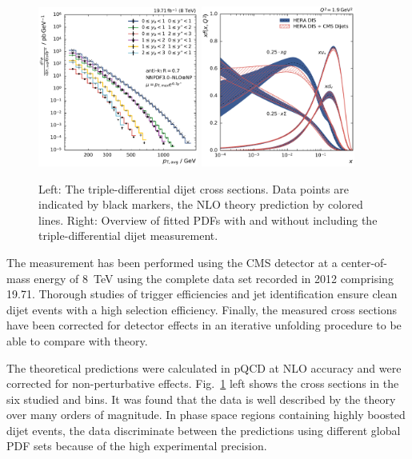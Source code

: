 \begin{figure}[h!tbp]
    \centering
    \includegraphics[width=0.47\textwidth]{figures/measurement/ptavg_spectrum.pdf}\hfill
    \includegraphics[width=0.45\textwidth]{figures/pdf_constraints/pdfcomp_direct_overview_1.9.pdf}
    \caption[Summary plot of results]{Left:
    The triple-differential dijet cross sections. Data points are indicated by black
    markers, the NLO theory prediction by colored lines. Right: Overview of
    fitted PDFs with and without including the triple-differential dijet
    measurement.}
    \label{fig:conclusion}
\end{figure}

The measurement has been performed using the CMS detector at a center-of-mass
energy of \SI{8}{\TeV} using the complete data set recorded in 2012 comprising
\SI{19.71}{\fbinv}. Thorough studies of trigger efficiencies and jet
identification ensure clean dijet events with a high selection efficiency.
Finally, the measured cross sections have been corrected for detector effects in
an iterative unfolding procedure to be able to compare with theory.

The theoretical predictions were calculated in pQCD at NLO accuracy and were
corrected for non-perturbative effects. Fig.~\ref{fig:conclusion} left shows the
cross sections in the six studied \ystar and \yboost bins. It was found that the
data is well described by the theory over many orders of magnitude. In
phase space regions containing highly boosted dijet events, the data
discriminate between the predictions using different global PDF sets because of
the high experimental precision.

